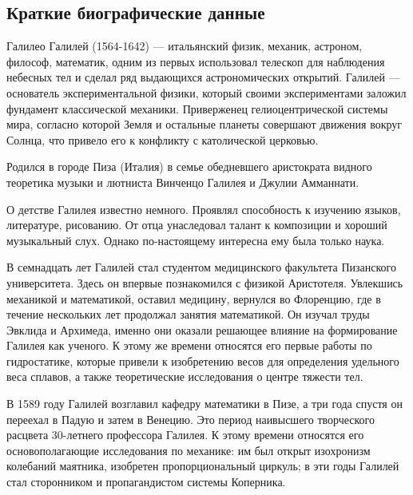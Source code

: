 \documentclass[
]{article}
\begin{document}
\hypertarget{ux43aux440ux430ux442ux43aux438ux435-ux431ux438ux43eux433ux440ux430ux444ux438ux447ux435ux441ux43aux438ux435-ux434ux430ux43dux43dux44bux435-1}{%
\subsection{Краткие биографические
данные}\label{ux43aux440ux430ux442ux43aux438ux435-ux431ux438ux43eux433ux440ux430ux444ux438ux447ux435ux441ux43aux438ux435-ux434ux430ux43dux43dux44bux435-1}}

Галилео Галилей (1564-1642) --- итальянский физик, механик, астроном,
философ, математик, одним из первых использовал телескоп для наблюдения
небесных тел и сделал ряд выдающихся астрономических открытий. Галилей
--- основатель экспериментальной физики, который своими экспериментами
заложил фундамент классической механики. Приверженец гелиоцентрической
системы мира, согласно которой Земля и остальные планеты совершают
движения вокруг Солнца, что привело его к конфликту с католической
церковью.

Родился в городе Пиза (Италия) в семье обедневшего аристократа видного
теоретика музыки и лютниста Винченцо Галилея и Джулии Амманнати.

О детстве Галилея известно немного. Проявлял способность к изучению
языков, литературе, рисованию. От отца унаследовал талант к композиции и
хороший музыкальный слух. Однако по-настоящему интересна ему была только
наука.

В семнадцать лет Галилей стал студентом медицинского факультета
Пизанского университета. Здесь он впервые познакомился с физикой
Аристотеля. Увлекшись механикой и математикой, оставил медицину,
вернулся во Флоренцию, где в течение нескольких лет продолжал занятия
математикой. Он изучал труды Эвклида и Архимеда, именно они оказали
решающее влияние на формирование Галилея как ученого. К этому же времени
относятся его первые работы по гидростатике, которые привели к
изобретению весов для определения удельного веса сплавов, а также
теоретические исследования о центре тяжести тел.

В 1589 году Галилей возглавил кафедру математики в Пизе, а три года
спустя он переехал в Падую и затем в Венецию. Это период наивысшего
творческого расцвета 30-летнего профессора Галилея. К этому времени
относятся его основополагающие исследования по механике: им был открыт
изохронизм колебаний маятника, изобретен пропорциональный циркуль; в эти
годы Галилей стал сторонником и пропагандистом системы Коперника.
\end{document}
